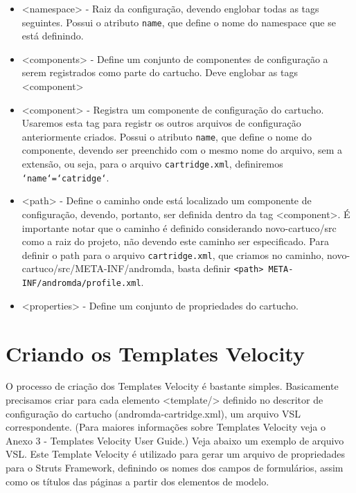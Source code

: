 \begin{enumerate}
	\begin{itemize}
	  \item <namespace> - Raiz da configuração, devendo englobar todas as tags
	  seguintes. Possui o atributo \texttt{name}, que define o nome do namespace
	  que se está definindo.
	  \item <components> - Define um conjunto de componentes de configuração a
	  serem registrados como parte do cartucho. Deve englobar as tags <component>
	  \item <component> - Registra um componente de configuração do cartucho.
	  Usaremos esta tag para registr os outros arquivos de configuração
	  anteriormente criados. Possui o atributo \texttt{name}, que define o nome do
	  componente, devendo ser preenchido com o mesmo nome do arquivo, sem a
	  extensão, ou seja, para o arquivo \texttt{cartridge.xml}, definiremos
	  \texttt{`name`=`catridge`}.
	  \item <path> - Define o caminho onde está localizado um componente de
	  configuração, devendo, portanto, ser definida dentro da tag <component>. É
	  importante notar que o caminho é definido considerando novo-cartuco/src como
	  a raiz do projeto, não devendo este caminho ser especificado. Para definir o
	  path para o arquivo \texttt{cartridge.xml}, que criamos no caminho,
	  novo-cartuco/src/META-INF/andromda, basta definir \texttt{<path>
	  META-INF/andromda/profile.xml}.
	  \item <properties> - Define um conjunto de propriedades do cartucho.
	\end{itemize}

\section{Criando os Templates Velocity}
O processo de criação dos Templates Velocity é bastante simples. Basicamente
precisamos criar para cada elemento <template/> definido no descritor de
configuração do cartucho (andromda-cartridge.xml), um arquivo VSL
correspondente. (Para maiores informações sobre Templates Velocity veja o Anexo
3 - Templates Velocity User Guide.) Veja abaixo um exemplo de arquivo VSL. Este
Template Velocity é utilizado para gerar um arquivo de propriedades para o
Struts Framework, definindo os nomes dos campos de formulários, assim como os
títulos das páginas a partir dos elementos de modelo.


\end{enumerate}
